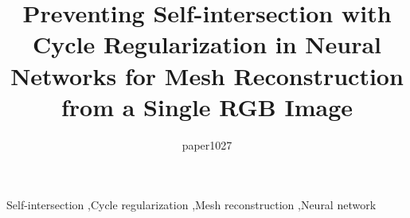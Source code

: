 \documentclass[final,3p]{elsarticle}
\newcommand{\mdf}[1]{\textcolor[rgb]{1.00,0.00,1.00}{#1}}
\begin{document}
\begin{frontmatter}
\title{Preventing Self-intersection with Cycle Regularization \mdf{in Neural Networks for Mesh Reconstruction from a Single RGB Image}}

\author{paper1027}




\begin{keyword}
Self-intersection \sep Cycle regularization \sep Mesh reconstruction \sep Neural network
\end{keyword}

\end{frontmatter}

\linenumbers








\end{document}
